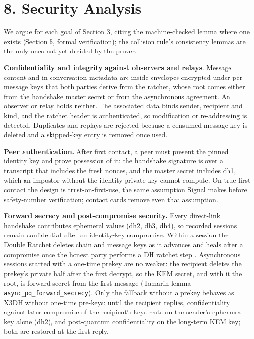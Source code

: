\documentclass[conference]{IEEEtran}
\begin{document}
\section{8. Security Analysis}
We argue for each goal of Section 3, citing the machine-checked lemma where one exists (Section 5, formal verification); the collision rule's consistency lemmas are the only ones not yet decided by the prover.

\textbf{Confidentiality and integrity against observers and relays.} Message content and in-conversation metadata are inside envelopes encrypted under per-message keys that both parties derive from the ratchet, whose root comes either from the handshake master secret or from the asynchronous agreement. An observer or relay holds neither. The associated data binds sender, recipient and kind, and the ratchet header is authenticated, so modification or re-addressing is detected. Duplicates and replays are rejected because a consumed message key is deleted and a skipped-key entry is removed once used.

\textbf{Peer authentication.} After first contact, a peer must present the pinned identity key and prove possession of it: the handshake signature is over a transcript that includes the fresh nonces, and the master secret includes dh1, which an impostor without the identity private key cannot compute. On true first contact the design is trust-on-first-use, the same assumption Signal makes before safety-number verification; contact cards remove even that assumption.

\textbf{Forward secrecy and post-compromise security.} Every direct-link handshake contributes ephemeral values (dh2, dh3, dh4), so recorded sessions remain confidential after an identity-key compromise. Within a session the Double Ratchet deletes chain and message keys as it advances and heals after a compromise once the honest party performs a DH ratchet step \cite{ref2,ref3}. Asynchronous sessions started with a one-time prekey are no weaker: the recipient deletes the prekey's private half after the first decrypt, so the KEM secret, and with it the root, is forward secret from the first message (Tamarin lemma \texttt{async\_pq\_forward\_secrecy}). Only the fallback without a prekey behaves as X3DH without one-time pre-keys: until the recipient replies, confidentiality against later compromise of the recipient's keys rests on the sender's ephemeral key alone (dh2), and post-quantum confidentiality on the long-term KEM key; both are restored at the first reply.
\end{document}
